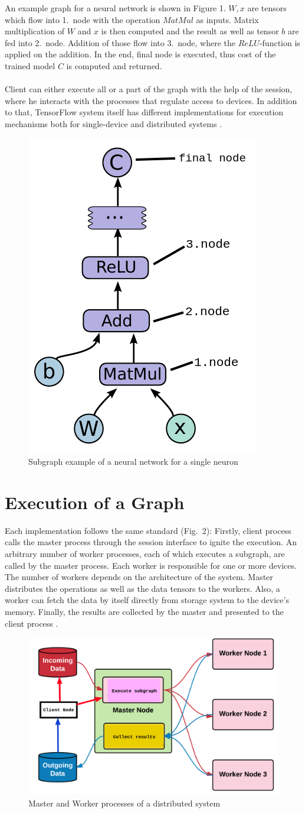 \documentclass[ieeetran]{article}
\begin{document}
An example graph for a neural network is shown in Figure 1. $W, x$ are tensors which flow into 1.\ node with the operation $MatMul$ as inputs. Matrix multiplication of $W$ and $x$ is then computed and the result as well as tensor $b$ are fed into 2.\ node. Addition of those flow into 3.\ node, where the $ReLU$-function is applied on the addition. In the end, final node is executed, thus cost of the trained model $C$ is computed and returned.
\\ \\Client can either execute all or a part of the graph with the help of the session, where he interacts with the processes that regulate access to devices. In addition to that, TensorFlow system itself has different implementations for execution mechanisms both for single-device and distributed systems \cite{first}.
\begin{figure}[h!]
  \centering
   \includegraphics[width=0.25\linewidth]{graph}
\caption[placeholder]{Subgraph example of a neural network for a single neuron\footnotemark}
  \label{fig:graph_caption_placeholder_subgraph_example_for_a_neural_networkfootnotemark}
\end{figure}
\section{Execution of a Graph} %
\label{sec:execution_of_a_graph}
Each implementation follows the same standard (Fig.\ 2): Firstly, client process calls the master process through the session interface to ignite the execution. An arbitrary number of worker processes, each of which executes a subgraph, are called by the master process. Each worker is responsible for one or more devices. The number of workers depends on the architecture of the system. Master distributes the operations as well as the data tensors to the workers. Also, a worker can fetch the data by itself directly from storage system to the device's memory. Finally, the results are collected by the master and presented to the client process \cite{first}.
\begin{figure}[h!]
  \centering
\includegraphics[width=0.5\linewidth]{executionofgraph}
 \caption[placeholder]{Master and Worker processes of a distributed system\footnotemark} 
  \label{fig:executionofgraph}
\end{figure}
\end{document}
